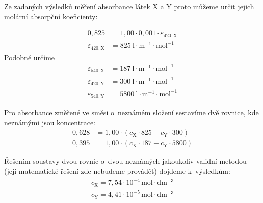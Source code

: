\documentclass{book}
\begin{document}
Ze zadaných výsledků měření absorbance látek X a Y proto můžeme určit
jejich molární absorpční koeficienty:

\begin{align*}
0,825 & =1,00\cdot0,001\cdot\varepsilon_{420,\mathrm{X}}\\
\varepsilon_{420,\mathrm{X}} & =825\ \mathrm{l\cdot m^{-1}\cdot mol^{-1}}
\end{align*}
Podobně určíme 
\begin{align*}
\varepsilon_{540,\mathrm{X}} & =187\ \mathrm{l\cdot m^{-1}\cdot mol^{-1}}\\
\varepsilon_{420,\mathrm{Y}} & =300\ \mathrm{l\cdot m^{-1}\cdot mol^{-1}}\\
\varepsilon_{540,\mathrm{Y}} & =5800\ \mathrm{l\cdot m^{-1}\cdot mol^{-1}}
\end{align*}

Pro absorbance změřené ve směsi o~neznámém složení sestavíme dvě rovnice,
kde neznámými jsou koncentrace:
\begin{align*}
0,628 & =1,00\cdot(\mathrm{\mathit{c}_{X}}\cdot825+\mathrm{\mathit{c}_{Y}}\cdot300)\\
0,395 & =1,00\cdot(\mathrm{\mathit{c}_{X}}\cdot187+\mathrm{\mathit{c}_{Y}}\cdot5800)
\end{align*}

Řešením soustavy dvou rovnic o~dvou neznámých jakoukoliv validní metodou (její matematické řešení zde nebudeme provádět) dojdeme k~výsledkům:
\begin{align*}
\mathrm{\mathit{c}_{X}}=7,54\cdot10^{-4}\,\mathrm{mol\cdot dm^{-3}}\\
\mathrm{\mathit{c}_{Y}}=4,41\cdot10^{-5}\mathrm{\,mol\cdot dm^{-3}}
\end{align*}
\end{document}
